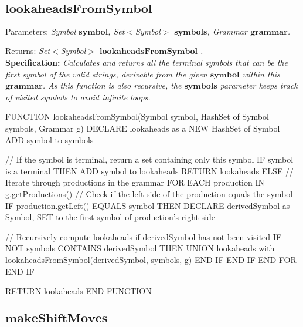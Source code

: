 \vspace{30pt}

\subsection*{\(\boldsymbol{lookaheadsFromSymbol}\)}

Parameters: \textit{Symbol \(\boldsymbol{symbol}\), Set\(<\)Symbol\(>\) \(\boldsymbol{symbols}\), Grammar \(\boldsymbol{grammar}\).}

Returns: \textit{Set\(<\)Symbol\(>\) \(\boldsymbol{lookaheadsFromSymbol}\) .}\\

\textbf{Specification:} \textit{Calculates and returns all the terminal symbols that can be the first symbol of the valid strings, derivable from the given \(\boldsymbol{symbol}\) within this \(\boldsymbol{grammar}\). As this function is also recursive, the \(\boldsymbol{symbols}\) parameter keeps track of visited symbols to avoid infinite loops.}\\

\begin{codeblock}
    FUNCTION lookaheadsFromSymbol(Symbol symbol, HashSet of Symbol symbols, Grammar g)
    DECLARE lookaheads as a NEW HashSet of Symbol
    ADD symbol to symbols

    // If the symbol is terminal, return a set containing only this symbol
    IF symbol is a terminal THEN
    ADD symbol to lookaheads
    RETURN lookaheads
    ELSE
    // Iterate through productions in the grammar
    FOR EACH production IN g.getProductions()
    // Check if the left side of the production equals the symbol
    IF production.getLeft() EQUALS symbol THEN
    DECLARE derivedSymbol as Symbol, SET to the first symbol of production's right side

    // Recursively compute lookaheads if derivedSymbol has not been visited
    IF NOT symbols CONTAINS derivedSymbol THEN
    UNION lookaheads with lookaheadsFromSymbol(derivedSymbol, symbols, g)
    END IF
    END IF
    END FOR
    END IF

    RETURN lookaheads
    END FUNCTION

\end{codeblock}

\vspace{30pt}

\subsection*{\(\boldsymbol{makeShiftMoves}\)}

